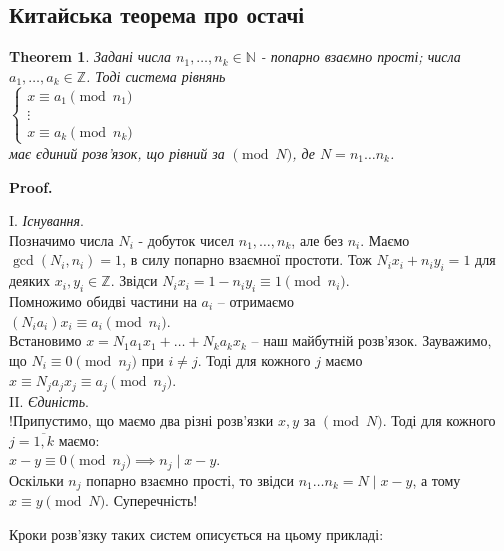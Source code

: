 \documentclass[a4paper, 10pt]{article}
\makeatletter
\theoremstyle{theoremdd}
\newtheorem{theorem}{Theorem}[subsection]
\theoremstyle{theoremdd}
\theoremstyle{theoremdd}
\theoremstyle{theoremdd}
\theoremstyle{theoremdd}
\theoremstyle{theoremdd}
\theoremstyle{theoremdd}
\theoremstyle{theoremdd}
\renewenvironment{proof}[1][Proof.\\]{\par
\pushQED{\hfill \qed}%
\normalfont \topsep6\p@\@plus6\p@\relax
\trivlist
\item\relax
{\bfseries
#1\@addpunct{.}}\hspace\labelsep\ignorespaces
}{%
\popQED\endtrivlist\@endpefalse
}
\makeatother
\begin{document}
\subsection{Китайська теорема про остачі}
\begin{theorem}
Задані числа $n_1,\dots,n_k \in \mathbb{N}$ - попарно взаємно прості; числа $a_1,\dots,a_k \in \mathbb{Z}$. Тоді система рівнянь\\
$\begin{cases}
x \equiv a_1 \pmod {n_1} \\
\vdots \\
x \equiv a_k \pmod {n_k}
\end{cases}$\\
має єдиний розв'язок, що рівний за $\!\pmod N$, де $N = n_1 \dots n_k$.
\end{theorem}

\begin{proof}
I. \textit{Існування}.\\
Позначимо числа $N_i$ - добуток чисел $n_1,\dots,n_k$, але без $n_i$. Маємо \\ $\gcd(N_i,n_i) = 1$, в силу попарно взаємної простоти. Тож $N_i x_i + n_i y_i = 1$ для деяких $x_i,y_i \in \mathbb{Z}$. Звідси $N_ix_i = 1 - n_i y_i \equiv 1 \pmod {n_i}$.\\
Помножимо обидві частини на $a_i$ -- отримаємо\\
$(N_ia_i)x_i \equiv a_i \pmod {n_i}$.\\
Встановимо $x = N_1a_1x_1 + \dots + N_k a_k x_k$ -- наш майбутній розв'язок. Зауважимо, що $N_i \equiv 0 \pmod {n_j}$ при $i \neq j$. Тоді для кожного $j$ маємо\\
$x \equiv N_ja_jx_j \equiv a_j \pmod {n_j}$.
\bigskip \\
II. \textit{Єдиність}.\\
!Припустимо, що маємо два різні розв'язки $x,y$ за $\pmod N$. Тоді для кожного $j = \overline{1,k}$ маємо:\\
$x-y \equiv 0 \pmod{n_j} \implies n_j \mid x-y$.\\
Оскільки $n_j$ попарно взаємно прості, то звідси $n_1 \dots n_k = N \mid x-y$, а тому $x \equiv y \pmod {N}$. Суперечність!
\end{proof}

Кроки розв'язку таких систем описується на цьому прикладі:
\end{document}
